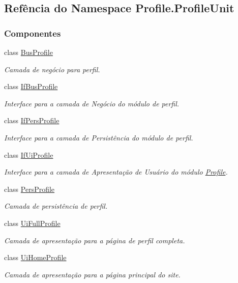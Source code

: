\hypertarget{namespaceProfile_1_1ProfileUnit}{}\subsection{Refência do Namespace Profile.\+Profile\+Unit}
\label{namespaceProfile_1_1ProfileUnit}
\subsubsection*{Componentes}
\begin{DoxyCompactItemize}
\item 
class \hyperlink{classProfile_1_1ProfileUnit_1_1BusProfile}{Bus\+Profile}
\begin{DoxyCompactList}\small\item\em Camada de negócio para perfil. \end{DoxyCompactList}\item 
class \hyperlink{classProfile_1_1ProfileUnit_1_1IfBusProfile}{If\+Bus\+Profile}
\begin{DoxyCompactList}\small\item\em Interface para a camada de Negócio do módulo de perfil. \end{DoxyCompactList}\item 
class \hyperlink{classProfile_1_1ProfileUnit_1_1IfPersProfile}{If\+Pers\+Profile}
\begin{DoxyCompactList}\small\item\em Interface para a camada de Persistência do módulo de perfil. \end{DoxyCompactList}\item 
class \hyperlink{classProfile_1_1ProfileUnit_1_1IfUiProfile}{If\+Ui\+Profile}
\begin{DoxyCompactList}\small\item\em Interface para a camada de Apresentação de Usuário do módulo \hyperlink{namespaceProfile}{Profile}. \end{DoxyCompactList}\item 
class \hyperlink{classProfile_1_1ProfileUnit_1_1PersProfile}{Pers\+Profile}
\begin{DoxyCompactList}\small\item\em Camada de persistência de perfil. \end{DoxyCompactList}\item 
class \hyperlink{classProfile_1_1ProfileUnit_1_1UiFullProfile}{Ui\+Full\+Profile}
\begin{DoxyCompactList}\small\item\em Camada de apresentação para a página de perfil completa. \end{DoxyCompactList}\item 
class \hyperlink{classProfile_1_1ProfileUnit_1_1UiHomeProfile}{Ui\+Home\+Profile}
\begin{DoxyCompactList}\small\item\em Camada de apresentação para a página principal do site. \end{DoxyCompactList}\end{DoxyCompactItemize}
